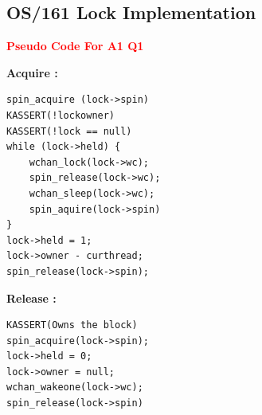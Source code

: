 \documentclass[twoside]{article}
\begin{document}
\subsection{OS/161 Lock Implementation}
\begin{center}
\textbf{\textcolor{red}{Pseudo Code For A1 Q1}}
\end{center}
\textbf{Acquire :}
\begin{lstlisting}
spin_acquire (lock->spin) 
KASSERT(!lockowner)
KASSERT(!lock == null) 
while (lock->held) {
	wchan_lock(lock->wc);
	spin_release(lock->wc);
	wchan_sleep(lock->wc);
	spin_aquire(lock->spin)
}
lock->held = 1;
lock->owner - curthread;
spin_release(lock->spin);
\end{lstlisting}
\textbf{Release :}
\begin{lstlisting}
KASSERT(Owns the block) 
spin_acquire(lock->spin);
lock->held = 0;
lock->owner = null;
wchan_wakeone(lock->wc);
spin_release(lock->spin)
\end{lstlisting}
\end{document}
